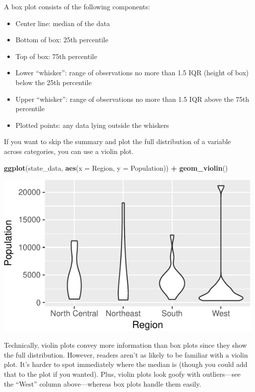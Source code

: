 \documentclass[12pt,oneside,openany]{book}
\newenvironment{Shaded}{\begin{snugshade}}{\end{snugshade}}
\newcommand{\KeywordTok}[1]{\textcolor[rgb]{0.13,0.29,0.53}{\textbf{#1}}}
\newcommand{\DataTypeTok}[1]{\textcolor[rgb]{0.13,0.29,0.53}{#1}}
\newcommand{\StringTok}[1]{\textcolor[rgb]{0.31,0.60,0.02}{#1}}
\newcommand{\OperatorTok}[1]{\textcolor[rgb]{0.81,0.36,0.00}{\textbf{#1}}}
\newcommand{\NormalTok}[1]{#1}
\providecommand{\tightlist}{%
  \setlength{\itemsep}{0pt}\setlength{\parskip}{0pt}}
\begin{document}
A box plot consists of the following components:

\begin{itemize}
\tightlist
\item
  Center line: median of the data
\item
  Bottom of box: 25th percentile
\item
  Top of box: 75th percentile
\item
  Lower ``whisker'': range of observations no more than 1.5 IQR (height
  of box) below the 25th percentile
\item
  Upper ``whisker'': range of observations no more than 1.5 IQR above
  the 75th percentile
\item
  Plotted points: any data lying outside the whiskers
\end{itemize}

If you want to skip the summary and plot the full distribution of a
variable across categories, you can use a violin plot.

\begin{Shaded}
\begin{Highlighting}[]
\KeywordTok{ggplot}\NormalTok{(state_data, }\KeywordTok{aes}\NormalTok{(}\DataTypeTok{x =}\NormalTok{ Region, }\DataTypeTok{y =}\NormalTok{ Population)) }\OperatorTok{+}
\StringTok{  }\KeywordTok{geom_violin}\NormalTok{()}
\end{Highlighting}
\end{Shaded}

\includegraphics{pdaps_files/figure-latex/violin-1.pdf}

Technically, violin plots convey more information than box plots since
they show the full distribution. However, readers aren't as likely to be
familiar with a violin plot. It's harder to spot immediately where the
median is (though you could add that to the plot if you wanted). Plus,
violin plots look goofy with outliers---see the ``West'' column
above---whereas box plots handle them easily.
\end{document}
